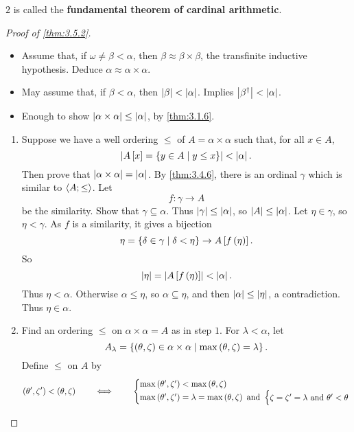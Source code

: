 $ 2 $ is called the \textbf{fundamental theorem of cardinal arithmetic}.


\begin{proof}[Proof of \ref{thm:3.5.2}]
\hfill
\begin{itemize}
\item Assume that, if $ \omega \ne \beta < \alpha $, then $ \beta \approx \beta \times \beta $, the transfinite inductive hypothesis. Deduce $ \alpha \approx \alpha \times \alpha $.
\item May assume that, if $ \beta < \alpha $, then $ \abs{\beta} < \abs{\alpha} $. Implies $ \abs{\beta^\dagger} < \abs{\alpha} $.
\item Enough to show $ \abs{\alpha \times \alpha} \le \abs{\alpha} $, by \ref{thm:3.1.6}.
\end{itemize}
\begin{enumerate}[leftmargin=0.5in, label=Step \arabic*.]
\item Suppose we have a well ordering $ \le $ of $ A = \alpha \times \alpha $ such that, for all $ x \in A $,
$$ \abs{A\sb{x} = \cb{y \in A \mid y \le x}} < \abs{\alpha}. $$
Then prove that $ \abs{\alpha \times \alpha} = \abs{\alpha} $. By \ref{thm:3.4.6}, there is an ordinal $ \gamma $ which is similar to $ \ab{A; \le} $. Let
$$ f : \gamma \to A $$
be the similarity. Show that $ \gamma \subseteq \alpha $. Thus $ \abs{\gamma} \le \abs{\alpha} $, so $ \abs{A} \le \abs{\alpha} $. Let $ \eta \in \gamma $, so $ \eta < \gamma $. As $ f $ is a similarity, it gives a bijection
$$ \eta = \cb{\delta \in \gamma \mid \delta < \eta} \to A\sb{f\rb{\eta}}. $$
So
$$ \abs{\eta} = \abs{A\sb{f\rb{\eta}}} < \abs{\alpha}. $$
Thus $ \eta < \alpha $. Otherwise $ \alpha \le \eta $, so $ \alpha \subseteq \eta $, and then $ \abs{\alpha} \le \abs{\eta} $, a contradiction. Thus $ \eta \in \alpha $.
\item Find an ordering $ \le $ on $ \alpha \times \alpha = A $ as in step $ 1 $. For $ \lambda < \alpha $, let
$$ A_\lambda = \cb{\rb{\theta, \zeta} \in \alpha \times \alpha \mid \max\rb{\theta, \zeta} = \lambda}. $$
Define $ \le $ on $ A $ by
$$ \rb{\theta', \zeta'} < \rb{\theta, \zeta} \qquad \iff \qquad \begin{cases}
\max\rb{\theta', \zeta'} < \max\rb{\theta, \zeta} \\
\max\rb{\theta', \zeta'} = \lambda = \max\rb{\theta, \zeta} \ \text{and} \ \begin{cases}
\zeta = \zeta' = \lambda \ \text{and} \ \theta' < \theta \\

\end{cases}
\end{cases}$$
\end{enumerate}
\end{proof}
